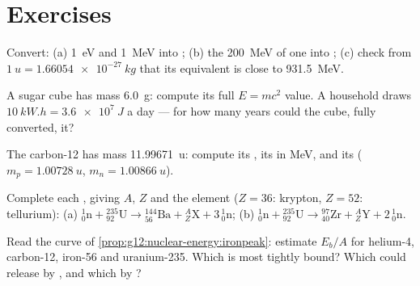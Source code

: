 \section{Exercises}

\begin{exercise}[$\star$]\label{exo:g12:nuclear-energy:1}
Convert: (a) \qty{1}{eV} and \qty{1}{MeV} into ; (b) the \qty{200}{MeV} of
one  into ; (c) check from $\qty{1}{u} = \qty{1.66054e-27}{kg}$
that its  equivalent is close to \qty{931.5}{MeV}.
\end{exercise}

\begin{exercise}[$\star$]\label{exo:g12:nuclear-energy:2}
A sugar cube has mass \qty{6.0}{g}: compute its full $E = mc^2$ value. A
household draws $\qty{10}{kW.h} = \qty{3.6e7}{J}$ a day --- for how many
years could the cube, fully converted,  it?
\end{exercise}

\begin{exercise}[$\star$]\label{exo:g12:nuclear-energy:3}
The carbon-12  has mass \qty{11.99671}{u}: compute its ,
its  in \unit{MeV}, and its 
($m_p = \qty{1.00728}{u}$, $m_n = \qty{1.00866}{u}$).
\end{exercise}

\begin{exercise}[$\star$]\label{exo:g12:nuclear-energy:4}
Complete each , giving $A$, $Z$ and the element ($Z = 36$: krypton,
$Z = 52$: tellurium):
(a) ${}^{1}_{0}\mathrm{n} + {}^{235}_{92}\mathrm{U} \to
{}^{144}_{56}\mathrm{Ba} + {}^{A}_{Z}\mathrm{X} + 3\,{}^{1}_{0}\mathrm{n}$;
(b) ${}^{1}_{0}\mathrm{n} + {}^{235}_{92}\mathrm{U} \to
{}^{97}_{40}\mathrm{Zr} + {}^{A}_{Z}\mathrm{Y} + 2\,{}^{1}_{0}\mathrm{n}$.
\end{exercise}

\begin{exercise}[$\star$]\label{exo:g12:nuclear-energy:5}
Read the curve of \cref{prop:g12:nuclear-energy:ironpeak}: estimate $E_b/A$ for
helium-4, carbon-12, iron-56 and uranium-235. Which is most tightly bound?
Which could release  by , and which by ?
\end{exercise}

